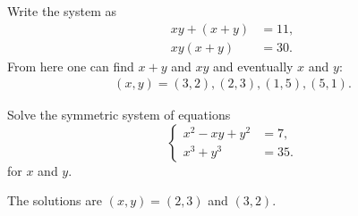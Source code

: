 

\begin{solution}
    Write the system as
        \begin{align*}
            xy+(x+y) &= 11,\\xy(x+y) &=30.
        \end{align*}
        From here one can find $x+y$ and $xy$ and eventually $x$ and $y$:
        \begin{align*}
            (x,y) = (3,2), (2,3), (1,5), (5,1).
        \end{align*}
\end{solution}


\begin{question}\label{p:sys-eq-B}
    Solve the symmetric system of equations $$\begin{cases}
        x^2-xy+y^2 &= 7,\\x^3+y^3 &=35.
    \end{cases}$$ for $x$ and $y$.
\end{question}


\begin{solution}
    The solutions are $(x,y)=(2,3)$ and $(3,2)$.
\end{solution}



